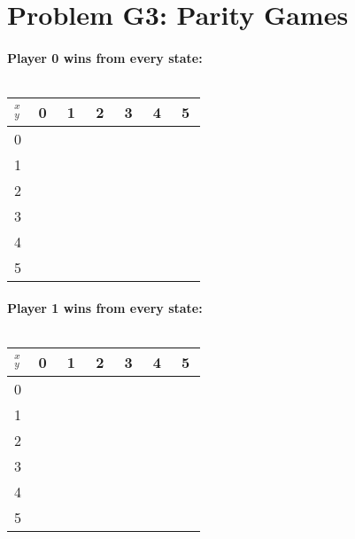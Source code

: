 \documentclass[12pt]{article}
\begin{document}
\section*{Problem G3: Parity Games}

\paragraph*{Player 0 wins from every state:}
\[ \: \]

\begin{tabular}{c | c | c | c | c | c | c}
$_y ^x$ & $\:$0$\:$ & $\:$1$\:$ & $\:$2$\:$ & $\:$3$\:$ & $\:$4$\:$ & $\:$5$\:$ \\ \hline
0 & & & & & & \\ \hline
1 & & & & & & \\ \hline
2 & & & & & & \\ \hline
3 & & & & & & \\ \hline
4 & & & & & & \\ \hline
5 & & & & & & \\ 


\end{tabular}

\paragraph*{Player 1 wins from every state:}
\[ \: \]

\begin{tabular}{c | c | c | c | c | c | c}
$_y ^x$ & $\:$0$\:$ & $\:$1$\:$ & $\:$2$\:$ & $\:$3$\:$ & $\:$4$\:$ & $\:$5$\:$ \\ \hline
0 & & & & & & \\ \hline
1 & & & & & & \\ \hline
2 & & & & & & \\ \hline
3 & & & & & & \\ \hline
4 & & & & & & \\ \hline
5 & & & & & & \\ 

\end{tabular}
\end{document}
